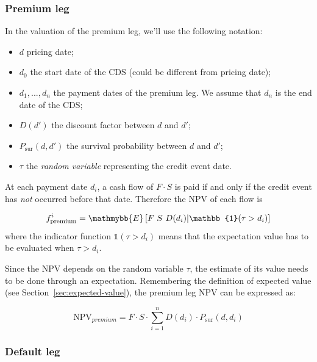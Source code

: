 \subsubsection{Premium leg}\label{premium-leg}

In the valuation of the premium leg, we'll use the following notation:

\begin{itemize}
\tightlist
\item $d$ pricing date;
\item $d_0$ the start date of the CDS (could be different from pricing date);
\item $d_1, ..., d_n$ the payment dates of the premium leg. We assume that $d_n$ is the end date of the CDS;
\item $D(d')$ the discount factor between $d$ and $d'$;
\item $P_{\textrm{sur}}(d, d')$ the survival probability between $d$ and $d'$;
\item $\tau$ the \emph{random variable} representing the credit event date.
\end{itemize}

At each payment date $d_i$, a cash flow of $F\cdot S$ is paid if and only if the credit event has \emph{not} occurred before that date. Therefore the NPV of each flow is

\begin{equation}
f_{\textrm{premium}}^i = \mathmybb{E}\left[F~S~D(d_i)|\mathbb{1}(\tau > d_i) \right]
\end{equation}
where the indicator function $\mathbb{1}(\tau > d_i)$ means that the expectation value has to be evaluated when $\tau > d_i$. 

Since the NPV depends on the random variable $\tau$, the estimate of its value needs to be done through an expectation.
Remembering the definition of expected value (see Section~\ref{sec:expected-value}), %
the premium leg NPV can be expressed as:

\begin{equation}
\textrm{NPV}_{premium} = F\cdot S \cdot \sum_{i=1}^{n} D(d_i) \cdot P_{\textrm{sur}}(d, d_i)
\end{equation}

\subsubsection{Default leg}
\label{default-leg}

